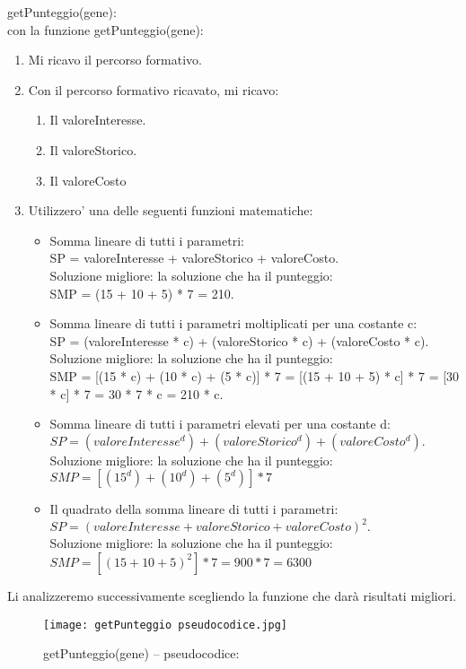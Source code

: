 \documentclass[10pt,a4paper]{article}
\begin{document}
      
      getPunteggio(gene):\\
      con la funzione getPunteggio(gene):\\
      \begin{enumerate}
       \item Mi ricavo il percorso formativo.
       \item Con il percorso formativo ricavato, mi ricavo:
         \begin{enumerate}
           \item Il valoreInteresse.
           \item Il valoreStorico.
           \item Il valoreCosto
         \end{enumerate}
       \item Utilizzero' una delle seguenti funzioni matematiche:
         \begin{itemize}
           \item Somma lineare di tutti i parametri:\\
                 SP = valoreInteresse + valoreStorico + valoreCosto.\\
                 Soluzione migliore: la soluzione che ha il punteggio:\\
                 SMP = (15 + 10 + 5) * 7 = 210.           
           \item Somma lineare di tutti i parametri moltiplicati per una costante c:\\
                 SP = (valoreInteresse * c) + (valoreStorico * c) + (valoreCosto * c).\\
                 Soluzione migliore: la soluzione che ha il punteggio:\\
                 SMP = [(15 * c) + (10 * c) + (5 * c)] * 7 = [(15 + 10 + 5) * c] * 7 = [30 * c] * 7 =
                 30 * 7 * c =  210 * c.
           \item Somma lineare di tutti i parametri elevati per una costante d:\\
                 $SP = (valoreInteresse ^ d) + (valoreStorico ^ d) + (valoreCosto ^ d).$\\
                 Soluzione migliore: la soluzione che ha il punteggio:\\
                 $SMP = [(15 ^ d) + (10 ^ d) + (5 ^ d)] * 7$
           \item Il quadrato della somma lineare di tutti i parametri:\\
                 $SP = (valoreInteresse + valoreStorico + valoreCosto)^ 2.$\\
                 Soluzione migliore: la soluzione che ha il punteggio:\\
                 $SMP = [(15 + 10 + 5) ^ 2] * 7 = 900 * 7 = 6300$
         \end{itemize}
       \end{enumerate}
       Li analizzeremo successivamente scegliendo la funzione che darà risultati migliori.
       \begin{figure}[h!]
        \centering
        \caption{getPunteggio(gene) -- pseudocodice:}
        \texttt{[image: getPunteggio pseudocodice.jpg]}
        \label{getPunteggioPseudocodice}
      \end{figure}
      
\end{document}
